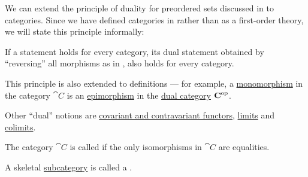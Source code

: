 \begin{remark}\label{thm:categorical_principle_of_duality}
  We can extend the principle of duality for preordered sets discussed in  to categories. Since we have defined categories in \hyperref[def:axiom_of_universes]{} rather than as a first-order theory, we will state this principle informally:
  \begin{displayquote}
    If a statement holds for every category, its dual statement obtained by \enquote{reversing} all morphisms as in , also holds for every category.
  \end{displayquote}

  This principle is also extended to definitions --- for example, a \hyperref[def:morphism_invertibility/monomorphism]{monomorphism} in the category \( \cat{C} \) is an \hyperref[def:morphism_invertibility/epimorphism]{epimorphism} in the \hyperref[def:dual_category]{dual category} \( \operatorname{\mathbf{C}}^{\operatorname{op}} \).

  Other \enquote{dual} notions are \hyperref[def:contravariant_functor]{covariant and contravariant functors}, \hyperref[def:categorical_limit]{limits} and \hyperref[def:categorical_colimit]{colimits}.
\end{remark}

\begin{definition}\label{def:skeletal_category}
  The category \( \cat{C} \) is called  if the only isomorphisms in \( \cat{C} \) are equalities.

  A skeletal \hyperref[def:subcategory]{subcategory} is called a .
\end{definition}

